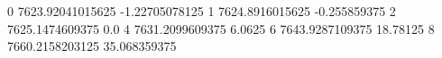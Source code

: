0 7623.92041015625 -1.22705078125
1 7624.8916015625 -0.255859375
2 7625.1474609375 0.0
4 7631.2099609375 6.0625
6 7643.9287109375 18.78125
8 7660.2158203125 35.068359375
